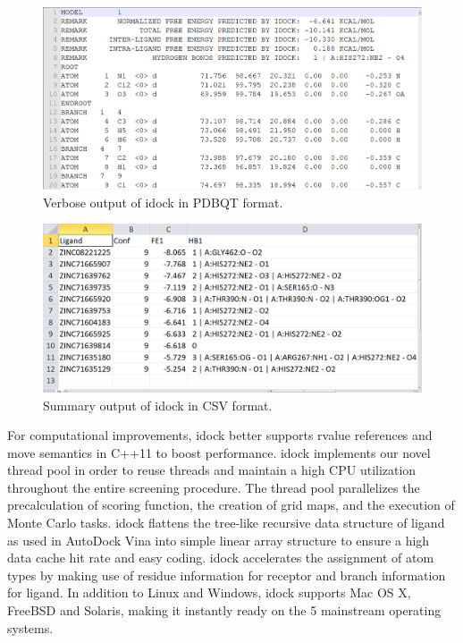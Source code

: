 
\begin{figure}
\centering
\includegraphics[width=\textwidth]{idock/OutputPDBQT.png}
\caption{Verbose output of idock in PDBQT format.}
\label{idock:OutputPDBQT}
\end{figure}

\begin{figure}
\centering
\includegraphics[width=\textwidth]{idock/OutputCSV.png}
\caption{Summary output of idock in CSV format.}
\label{idock:OutputCSV}
\end{figure}

For computational improvements, idock better supports rvalue references and move semantics in C++11 to boost performance. idock implements our novel thread pool in order to reuse threads and maintain a high CPU utilization throughout the entire screening procedure. The thread pool parallelizes the precalculation of scoring function, the creation of grid maps, and the execution of Monte Carlo tasks. idock flattens the tree-like recursive data structure of ligand as used in AutoDock Vina into simple linear array structure to ensure a high data cache hit rate and easy coding. idock accelerates the assignment of atom types by making use of residue information for receptor and branch information for ligand. In addition to Linux and Windows, idock supports Mac OS X, FreeBSD and Solaris, making it instantly ready on the 5 mainstream operating systems.

